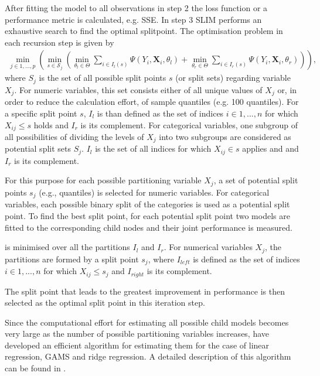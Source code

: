 After fitting the model to all observations in step 2 the loss function or a performance metric is calculated, e.g. SSE.
In step 3 SLIM performs an exhaustive search to find the optimal splitpoint.  
The optimisation problem in each recursion step is given by \begin{align}
    \min_{j \in 1,..., p} \left( \min_{s \in \mathcal{S}_j} \left(\min_{\theta_{l} \in \Theta}\sum_{i \in I_{l}(s)}\Psi(Y_{i}, \mathbf{X}_{i}, \theta_{l})  +  \min_{\theta_{r} \in \Theta}\sum_{i \in I_{r}(s)}\Psi(Y_{i}, \mathbf{X}_{i}, \theta_{r}) \right) \right),
\end{align}
where ${S}_j$ is the set of all possible split points $s$ (or split sets) regarding variable $X_j$. For numeric variables, this set consists either of all unique values of $X_j$ or, in order to reduce the calculation effort, of sample quantiles (e.g. 100 quantiles). For a specific split point $s$, $I_{l}$ is than defined as the set of indices $i \in 1,...,n$ for which $X_{ij} \leq s$ holds and $I_{r}$ is its complement. For categorical variables, one subgroup of all possibilities of dividing the levels of $X_{j}$ into two subgroups are considered as potential split sets $S_j$. $I_l$ is  the set of all indices for which $X_{ij} \in s$ applies and and $I_{r}$ is its complement.



For this purpose for each possible partitioning variable $X_j$, a set of potential split points $s_j$ (e.g., quantiles) is selected for numeric variables. For categorical variables, each possible binary split of the categories is used as a potential split point.
To find the best split point, for each potential split point two models are fitted to the corresponding child nodes and their joint performance is measured.

is minimised over all the partitions $I_{l}$ and $I_{r}$. 
For numerical variables $X_{j}$, the partitions are formed by a split point $s_{j}$, where $I_{left}$ is defined as the set of indices $i \in 1,...,n$ for which $X_{ij} \leq s_{j}$ and $I_{right}$ is its complement.



The split point that leads to the greatest improvement in performance is then selected as the optimal split point in this iteration step.

Since the computational effort for estimating all possible child models becomes very large as the number of possible partitioning variables increases, \citep{Hu.2020} have developed an efficient algorithm for estimating them for the case of linear regression, GAMS and ridge regression. A detailed description of this algorithm can be found in \citep{Hu.2020}.










